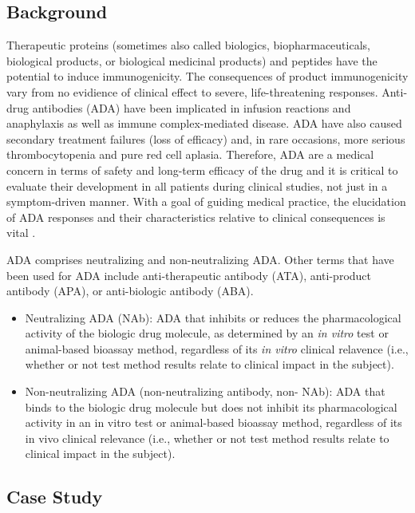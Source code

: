 \documentclass[]{article}
\providecommand{\tightlist}{%
  \setlength{\itemsep}{0pt}\setlength{\parskip}{0pt}}
\begin{document}
\subsection{Background}\label{background}

Therapeutic proteins (sometimes also called biologics,
biopharmaceuticals, biological products, or biological medicinal
products) and peptides have the potential to induce immunogenicity. The
consequences of product immunogenicity vary from no evidience of
clinical effect to severe, life-threatening responses. Anti-drug
antibodies (ADA) have been implicated in infusion reactions and
anaphylaxis as well as immune complex-mediated disease. ADA have also
caused secondary treatment failures (loss of efficacy) and, in rare
occasions, more serious thrombocytopenia and pure red cell aplasia.
Therefore, ADA are a medical concern in terms of safety and long-term
efficacy of the drug and it is critical to evaluate their development in
all patients during clinical studies, not just in a symptom-driven
manner. With a goal of guiding medical practice, the elucidation of ADA
responses and their characteristics relative to clinical consequences is
vital \citep{shankar2014assessment}.

ADA comprises neutralizing and non-neutralizing ADA. Other terms that
have been used for ADA include anti-therapeutic antibody (ATA),
anti-product antibody (APA), or anti-biologic antibody (ABA).

\begin{itemize}
\tightlist
\item
  Neutralizing ADA (NAb): ADA that inhibits or reduces the
  pharmacological activity of the biologic drug molecule, as determined
  by an \emph{in vitro} test or animal-based bioassay method, regardless
  of its \emph{in vitro} clinical relavence (i.e., whether or not test
  method results relate to clinical impact in the subject).
\item
  Non-neutralizing ADA (non-neutralizing antibody, non- NAb): ADA that
  binds to the biologic drug molecule but does not inhibit its
  pharmacological activity in an in vitro test or animal-based bioassay
  method, regardless of its in vivo clinical relevance (i.e., whether or
  not test method results relate to clinical impact in the subject).
\end{itemize}

\subsection{Case Study}\label{case-study}
\end{document}
